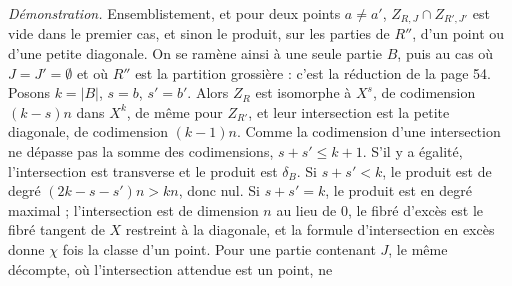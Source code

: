 \documentclass[11pt,a4paper]{article}
\begin{document}
\emph{Démonstration.} Ensemblistement, et pour deux points $a \neq a'$,
$Z_{R,J} \cap Z_{R',J'}$ est vide dans le premier cas, et sinon le produit,
sur les parties de $R''$, d'un point ou d'une petite diagonale. On se ramène
ainsi à une seule partie $B$, puis au cas où $J = J' = \emptyset$ et où $R''$
est la partition grossière : c'est la réduction de la page 54. Posons
$k = |B|$, $s = b$, $s' = b'$. Alors $Z_{R}$ est isomorphe à $X^{s}$, de
codimension $(k - s)n$ dans $X^{k}$, de même pour $Z_{R'}$, et leur
intersection est la petite diagonale, de codimension $(k-1)n$. Comme la
codimension d'une intersection ne dépasse pas la somme des codimensions,
$s + s' \leq k + 1$. S'il y a égalité, l'intersection est transverse et le
produit est $\delta_{B}$. Si $s + s' < k$, le produit est de degré
$(2k - s - s')n > kn$, donc nul. Si $s + s' = k$, le produit est en degré
maximal ; l'intersection est de dimension $n$ au lieu de $0$, le fibré d'excès
est le fibré tangent de $X$ restreint à la diagonale, et la formule
d'intersection en excès donne $\chi$ fois la classe d'un point. Pour une partie
contenant $J$, le même décompte, où l'intersection attendue est un point, ne
\end{document}
